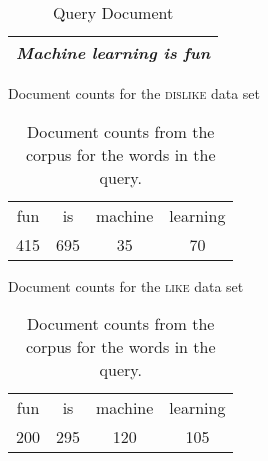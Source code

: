 \documentclass[--SOLUTION-OPTION--]{ditpaper}
\begin{document}
\newpage

				
\begin{table}[h]
\caption{Query Document}
\centering
\begin{tabular}{l}
\hline
\textit{Machine learning is fun}\\
\hline
\end{tabular}
\label{tab:likedislikequery}
\end{table}

\begin{table}[!htb]
    \caption{Document counts from the corpus for the words in the query.}
    \begin{minipage}{.5\linewidth}
      \centering
Document counts for the \textsc{dislike} data set
\begin{tabular}{|c|c|c|c|}
\hline
fun & is & machine & learning\\
415 & 695 & 35 & 70\\
\hline
\end{tabular}
    \end{minipage}%
    \begin{minipage}{.5\linewidth}
      \centering
Document counts for the \textsc{like} data set
\begin{tabular}{|c|c|c|c|}
\hline
fun & is & machine & learning\\
200 & 295 & 120 & 105\\
\hline
\end{tabular}
    \end{minipage} 
    \label{tab:doccounts}
\end{table}
\end{document}
